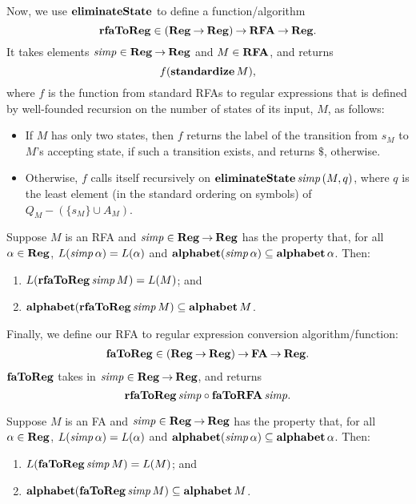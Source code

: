 %
Now, we use $\mathbf{eliminateState}$ to define a function/algorithm
\begin{displaymath}
  \mathbf{rfaToReg} \in (\mathbf{Reg}\mathbin{\to}\mathbf{Reg}) \mathbin{\to} \mathbf{RFA} \mathbin{\to} \mathbf{Reg} .
\end{displaymath}
It takes elements ${\it simp}\in\mathbf{Reg}\mathbin{\to}\mathbf{Reg}$ and $M\in\mathbf{RFA}$, and
returns
\begin{displaymath}
  f(\mathbf{standardize}\,M) ,
\end{displaymath}
where $f$ is the function from standard RFAs to regular expressions
that is defined by well-founded recursion on the number of states of
its input, $M$, as follows:
\begin{itemize}
\item If $M$ has only two states,  then $f$ returns the
  label of the transition from $s_M$ to $M$'s accepting state, if such
  a transition exists, and returns $\$$, otherwise.

\item Otherwise,  $f$ calls itself recursively on
  $\mathbf{eliminateState}\,{\it simp}\,(M,q)$, where $q$ is the least element (in the
  standard ordering on symbols) of $Q_M-(\{s_M\}\cup A_M)$.
\end{itemize}

\begin{proposition}
Suppose $M$ is an RFA and
${\it simp}\in\mathbf{Reg}\mathbin{\to}\mathbf{Reg}$ has the property that,
for all $\alpha\in\mathbf{Reg}$, $L({\it simp}\,\alpha) = L(\alpha)$ and
$\mathbf{alphabet}({\it simp}\,\alpha)\subseteq\mathbf{alphabet}\,\alpha$.
Then:
\begin{enumerate}[\quad(1)]
\item $L(\mathbf{rfaToReg}\,{\it simp}\,M) = L(M)$; and 

\item $\mathbf{alphabet}(\mathbf{rfaToReg}\,{\it simp}\,M) \subseteq \mathbf{alphabet}\,M$.
\end{enumerate}
\end{proposition}

Finally, we define our RFA to regular expression conversion algorithm/function:
%
\begin{gather*}
\mathbf{faToReg}\in(\mathbf{Reg}\mathbin{\to}\mathbf{Reg})\mathbin{\to}\mathbf{FA}\mathbin{\to}\mathbf{Reg} .  
\end{gather*}
$\mathbf{faToReg}$ takes in ${\it simp}\in\mathbf{Reg}\mathbin{\to}\mathbf{Reg}$, and returns
\begin{displaymath}
\mathbf{rfaToReg}\,{\it simp} \circ \mathbf{faToRFA}\,{\it simp} .
\end{displaymath}

\begin{proposition}
Suppose $M$ is an FA and
${\it simp}\in\mathbf{Reg}\mathbin{\to}\mathbf{Reg}$ has the property that,
for all $\alpha\in\mathbf{Reg}$, $L({\it simp}\,\alpha) = L(\alpha)$ and
$\mathbf{alphabet}({\it simp}\,\alpha)\subseteq\mathbf{alphabet}\,\alpha$.
Then:
\begin{enumerate}[\quad(1)]
\item $L(\mathbf{faToReg}\,{\it simp}\,M) = L(M)$; and 

\item $\mathbf{alphabet}(\mathbf{faToReg}\,{\it simp}\,M) \subseteq \mathbf{alphabet}\,M$.
\end{enumerate}
\end{proposition}

